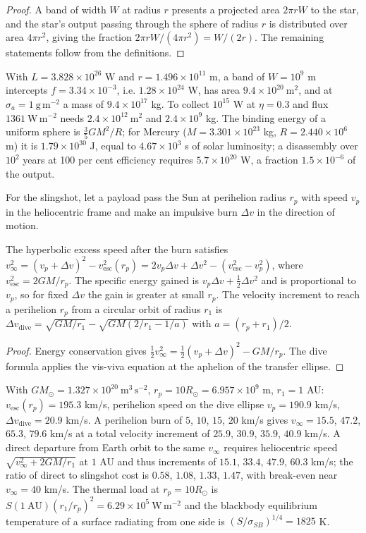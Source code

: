 \begin{proof}
A band of width $W$ at radius $r$ presents a projected area $2\pi rW$ to the star, and the star's output passing through the sphere of radius $r$ is distributed over area $4\pi r^2$, giving the fraction $2\pi rW/(4\pi r^2)=W/(2r)$. The remaining statements follow from the definitions.
\end{proof}

With $L=3.828\times10^{26}$ W and $r=1.496\times10^{11}$ m, a band of $W=10^9$ m intercepts $f=3.34\times10^{-3}$, i.e. $1.28\times10^{24}$ W, has area $9.4\times10^{20}\ \mathrm{m^2}$, and at $\sigma_a=1\ \mathrm{g\,m^{-2}}$ a mass of $9.4\times10^{17}$ kg. To collect $10^{15}$ W at $\eta=0.3$ and flux $1361\ \mathrm{W\,m^{-2}}$ needs $2.4\times10^{12}\ \mathrm{m^2}$ and $2.4\times10^{9}$ kg. The binding energy of a uniform sphere is $\tfrac35GM^2/R$; for Mercury ($M=3.301\times10^{23}$ kg, $R=2.440\times10^6$ m) it is $1.79\times10^{30}$ J, equal to $4.67\times10^3$ s of solar luminosity; a disassembly over $10^2$ years at 100 per cent efficiency requires $5.7\times10^{20}$ W, a fraction $1.5\times10^{-6}$ of the output.

For the slingshot, let a payload pass the Sun at perihelion radius $r_p$ with speed $v_p$ in the heliocentric frame and make an impulsive burn $\Delta v$ in the direction of motion.

\begin{proposition}
The hyperbolic excess speed after the burn satisfies $v_\infty^2=(v_p+\Delta v)^2-v_{\mathrm{esc}}^2(r_p)=2v_p\Delta v+\Delta v^2-(v_{\mathrm{esc}}^2-v_p^2)$, where $v_{\mathrm{esc}}^2=2GM/r_p$. The specific energy gained is $v_p\Delta v+\tfrac12\Delta v^2$ and is proportional to $v_p$, so for fixed $\Delta v$ the gain is greater at small $r_p$. The velocity increment to reach a perihelion $r_p$ from a circular orbit of radius $r_1$ is $\Delta v_{\mathrm{dive}}=\sqrt{GM/r_1}-\sqrt{GM(2/r_1-1/a)}$ with $a=(r_p+r_1)/2$.
\end{proposition}

\begin{proof}
Energy conservation gives $\tfrac12v_\infty^2=\tfrac12(v_p+\Delta v)^2-GM/r_p$. The dive formula applies the vis-viva equation at the aphelion of the transfer ellipse.
\end{proof}

With $GM_\odot=1.327\times10^{20}\ \mathrm{m^3\,s^{-2}}$, $r_p=10R_\odot=6.957\times10^9$ m, $r_1=1$ AU: $v_{\mathrm{esc}}(r_p)=195.3$ km/s, perihelion speed on the dive ellipse $v_p=190.9$ km/s, $\Delta v_{\mathrm{dive}}=20.9$ km/s. A perihelion burn of $5$, $10$, $15$, $20$ km/s gives $v_\infty=15.5$, $47.2$, $65.3$, $79.6$ km/s at a total velocity increment of $25.9$, $30.9$, $35.9$, $40.9$ km/s. A direct departure from Earth orbit to the same $v_\infty$ requires heliocentric speed $\sqrt{v_\infty^2+2GM/r_1}$ at $1$ AU and thus increments of $15.1$, $33.4$, $47.9$, $60.3$ km/s; the ratio of direct to slingshot cost is $0.58$, $1.08$, $1.33$, $1.47$, with break-even near $v_\infty=40$ km/s. The thermal load at $r_p=10R_\odot$ is $S(1\ \mathrm{AU})(r_1/r_p)^2=6.29\times10^5\ \mathrm{W\,m^{-2}}$ and the blackbody equilibrium temperature of a surface radiating from one side is $(S/\sigma_{SB})^{1/4}=1825$ K.

